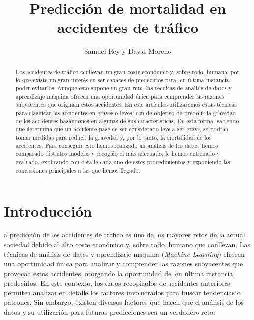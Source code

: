 \documentclass[journal,twoside]{JoPhA}
\begin{document}
\title{Predicción de mortalidad en accidentes de tráfico}
 
\author{Samuel Rey y David Moreno
}


\maketitle


\begin{abstract}
Los accidentes de tráfico conllevan un gran coste económico y, sobre todo, humano, por lo que existe un gran interés en ser capaces de predecirlos para, en última instancia, poder evitarlos. Aunque esto supone un gran reto, las técnicas de análisis de datos y aprendizaje máquina ofrecen una oportunidad única para comprender las razones subyacentes que originan estos accidentes. En este artículos utilizaremos estas técnicas para clasificar los accidentes en graves o leves, con de objetivo de predecir la gravedad de los accidentes basándonos en algunas de sus características. De esta forma, sabiendo que determina que un accidente pase de ser considerado leve a ser grave, se podrán tomar medidas para reducir la gravedad y, por lo tanto, la mortalidad de los accidentes. Para conseguir esto hemos realizado un análisis de los datos, hemos comparado distintos modelos y escogido el más adecuado, lo hemos entrenado y evaluado, explicando con detalle cada uno de estos procedimientos y exponiendo las conclusiones principales a las que hemos llegado.
\end{abstract}


\section{Introducción}
a predicción de los accidentes de tráfico es uno de los mayores retos de la actual sociedad debido al alto coste económico y, sobre todo, humano que conllevan. Las técnicas de análisis de datos y aprendizaje máquina (\textit{Machine Learning}) ofrecen una oportunidad única para analizar y comprender las razones subyacentes que provocan estos accidentes, otorgando la oportunidad de, en última instancia, predecirlos. En este contexto, los datos recopilados de accidentes anteriores permiten analizar en detalle los factores involucrados para buscar tendencias o patrones. Sin embargo, existen diversos factores que hacen que el análisis de los datos y su utilización para futuras predicciones sea un verdadero reto: \\
\end{document}
